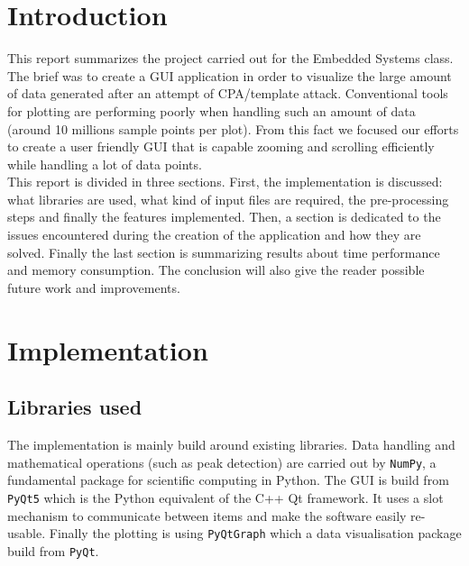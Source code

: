 \documentclass[11pt,a4paper]{article}
\begin{document}


\section{Introduction}
\label{sec:introduction}
This report summarizes the project carried out for the Embedded Systems class. The brief was to create a GUI application in order to visualize the large amount of data generated after an attempt of CPA/template attack. Conventional tools for plotting are performing poorly when handling such an amount of data (around 10 millions sample points per plot). From this fact we focused our efforts to create a user friendly GUI that is capable zooming and scrolling efficiently while handling a lot of data points.\\

This report is divided in three sections. First, the implementation is discussed: what libraries are used, what kind of input files are required, the pre-processing steps and finally the features implemented. Then, a section is dedicated to the issues encountered during the creation of the application and how they are solved. Finally the last section is summarizing results about time performance and memory consumption. The conclusion will also give the reader possible future work and improvements.


\section{Implementation}
\label{sec:implementation}
\subsection{Libraries used}
The implementation is mainly build around existing libraries. Data handling and mathematical operations (such as peak detection) are carried out by \texttt{NumPy}, a fundamental package for scientific computing in Python. The GUI is build from \texttt{PyQt5} which is the Python equivalent of the C++ Qt framework. It uses a slot mechanism to communicate between items and make the software easily re-usable. Finally the plotting is using \texttt{PyQtGraph} which a data visualisation package build from \texttt{PyQt}. 
\end{document}
